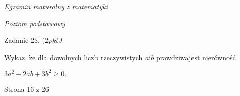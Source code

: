 \documentclass[a4paper,12pt]{article}
\begin{document}
{\it Egzamin maturalny z matematyki}

{\it Poziom podstawowy}

Zadanie 2{\$}. $(2pktJ$

Wykaz, $\dot{\mathrm{z}}\mathrm{e}$ dla dowolnych liczb rzeczywistych $a\mathrm{i}b$ prawdziwajest nierówność

$3a^{2}-2ab+3b^{2}\geq 0.$

Strona 16 z 26
\end{document}
